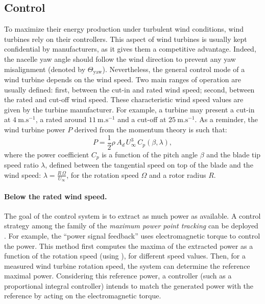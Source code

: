 \subsection{Control}
To maximize their energy production under turbulent wind conditions, wind turbines rely on their controllers. 
This aspect of wind turbines is usually kept confidential by manufacturers, as it gives them a competitive advantage.  
Indeed, the nacelle yaw angle should follow the wind direction to prevent any yaw misalignment (denoted by $\Theta_{\mathrm{yaw}}$). 
Nevertheless, the general control mode of a wind turbine depends on the wind speed. 
Two main ranges of operation are usually defined: first, between the cut-in and rated wind speed; second, between the rated and cut-off wind speed. 
These characteristic wind speed values are given by the turbine manufacturer. 
For example, a turbine may present a cut-in at $4~\mathrm{m.s^{-1}}$, a rated around $11~\mathrm{m.s^{-1}}$ and a cut-off at $25~\mathrm{m.s^{-1}}$. 
As a reminder, the wind turbine power $P$ derived from the momentum theory is such that: 
\begin{equation}
    P = \frac12 \rho \, A_d \, U_\infty^3 \, C_p(\beta,\lambda), 
    \label{eq:power_wt}
\end{equation}
where the power coefficient $C_p$ is a function of the pitch angle $\beta$ and the blade tip speed ratio $\lambda$, defined between the tangential speed on top of the blade and the wind speed: $\lambda = \frac{R \, \Omega}{U_\infty}$, for the rotation speed $\Omega$ and a rotor radius $R$. 

\paragraph{Below the rated wind speed.}
The goal of the control system is to extract as much power as available. 
A control strategy among the family of the \textit{maximum power point tracking} can be deployed \citep{abdullah_2012_control_review}.   
For example, the ``power signal feedback'' uses electromagnetic torque to control the power. 
This method first computes the maxima of the extracted power as a function of the rotation speed (using ), for different speed values. 
Then, for a measured wind turbine rotation speed, the system can determine the reference maximal power. 
Considering this reference power, a controller (such as a proportional integral controller) intends to match the generated power with the reference by acting on the electromagnetic torque. 


